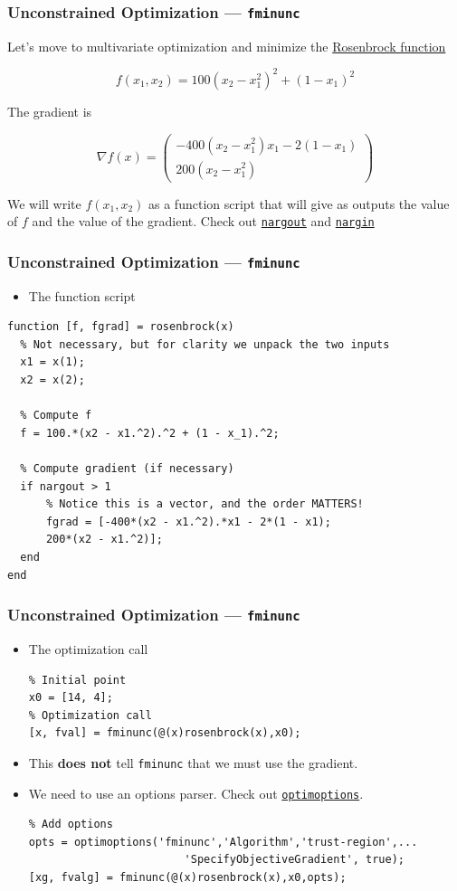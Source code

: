 \documentclass[11pt,xcolor={svgnames},aspectratio=169,usepdftitle=false]{beamer}
\begin{document}
\begin{frame}
  \frametitle{Unconstrained Optimization --- \texttt{fminunc}}
Let's move to multivariate optimization and minimize the \href{https://en.wikipedia.org/wiki/Rosenbrock_function}{Rosenbrock function}

\[
f(x_1,x_2) = 100 \left(x_2 - x^2_1\right)^2 + \left(1 - x_1\right)^2
\]

The gradient is

\[
\nabla f(x) = \begin{pmatrix}
  -400(x_2 - x_1^2)x_1 - 2(1 - x_1) \\
  200(x_2 - x^2_1)
\end{pmatrix}  
\]

We will write $f(x_1, x_2)$ as a function script that will give as outputs the value of $f$ and the value of the gradient. {\tiny Check out \href{https://www.mathworks.com/help/matlab/ref/nargout.html}{\texttt{nargout}} and \href{https://www.mathworks.com/help/matlab/ref/nargin.html}{\texttt{nargin}}}
\end{frame}

\begin{frame}[fragile]
  \frametitle{Unconstrained Optimization --- \texttt{fminunc}}
  \begin{itemize}
    \item The function script
  \end{itemize}
\begin{lstlisting}
function [f, fgrad] = rosenbrock(x)
  % Not necessary, but for clarity we unpack the two inputs
  x1 = x(1);
  x2 = x(2);

  % Compute f
  f = 100.*(x2 - x1.^2).^2 + (1 - x_1).^2;

  % Compute gradient (if necessary)
  if nargout > 1
      % Notice this is a vector, and the order MATTERS!
      fgrad = [-400*(x2 - x1.^2).*x1 - 2*(1 - x1);
      200*(x2 - x1.^2)];
  end
end
\end{lstlisting}
\end{frame}

\begin{frame}[fragile]
  \frametitle{Unconstrained Optimization --- \texttt{fminunc}}
  \begin{itemize}
    \item The optimization call
    \begin{lstlisting}
% Initial point
x0 = [14, 4];
% Optimization call
[x, fval] = fminunc(@(x)rosenbrock(x),x0);
    \end{lstlisting}
    \item This \alert{\textbf{does not}} tell \verb;fminunc; that we must use the gradient.
    \item We need to use an options parser. Check out \href{https://www.mathworks.com/help/optim/ug/optim.problemdef.optimizationproblem.optimoptions.html}{\texttt{optimoptions}}.
    \begin{lstlisting}
% Add options
opts = optimoptions('fminunc','Algorithm','trust-region',...
                        'SpecifyObjectiveGradient', true);
[xg, fvalg] = fminunc(@(x)rosenbrock(x),x0,opts);
    \end{lstlisting}
  \end{itemize}
\end{frame}
\end{document}
